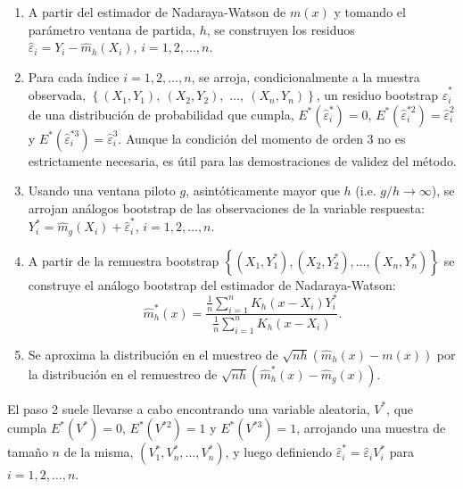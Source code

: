 \documentclass[
]{book}
\theoremstyle{definition}
\theoremstyle{definition}
\theoremstyle{definition}
\theoremstyle{remark}
\begin{document}
\begin{enumerate}
\def\labelenumi{\arabic{enumi}.}
\item
  A partir del estimador de Nadaraya-Watson de \(m\left( x \right)\) y
  tomando el parámetro ventana de partida, \(h\), se construyen los
  residuos
  \(\hat{\varepsilon}_i = Y_i - \hat{m}_{h}\left( X_i \right)\),
  \(i=1, 2, \ldots, n\).
\item
  Para cada índice \(i=1,2,\ldots ,n\), se arroja, condicionalmente a la
  muestra observada, \(\left\{ \left( X_1,Y_1 \right), \ \left( X_2,Y_2 \right),\right.\)
  \(\left.\ldots ,\ \left( X_n,Y_n \right) \right\}\),
  un residuo bootstrap \(\hat{\varepsilon}_i^{\ast}\) de una
  distribución de probabilidad que cumpla,
  \(E^{\ast}\left( \hat{\varepsilon}_i^{\ast} \right) =0\),
  \(E^{\ast}\left( \hat{\varepsilon}_i^{\ast 2} \right) =\hat{ \varepsilon}_i^2\) y \(E^{\ast}\left( \hat{\varepsilon}_i^{\ast 3} \right) =\hat{\varepsilon}_i^{3}\). Aunque la condición del
  momento de orden 3 no es estrictamente necesaria, es útil para las
  demostraciones de validez del método.
\item
  Usando una ventana piloto \(g\), asintóticamente mayor que \(h\) (i.e.
  \(g/h\rightarrow \infty\)), se arrojan análogos bootstrap de las
  observaciones de la variable respuesta:
  \(Y_i^{\ast}=\hat{m}_{g}\left(X_i \right)  +\hat{\varepsilon}_i^{\ast}\), \(i=1,2,\ldots ,n\).
\item
  A partir de la remuestra bootstrap \(\left\{ \left( X_1,Y_1^{\ast } \right),\left( X_2,Y_2^{\ast} \right),\ldots ,\left( X_n,Y_n^{\ast} \right) \right\}\) se construye el análogo
  bootstrap del estimador de Nadaraya-Watson:
  \[\hat{m}_{h}^{\ast}\left( x \right) =\frac{\frac{1}{n}\sum_{i=1}^{n}K_{h}
  \left( x-X_i \right) Y_i^{\ast}}{\frac{1}{n}\sum_{i=1}^{n}K_{h}\left(
  x-X_i \right)}.\]
\item
  Se aproxima la distribución en el muestreo de \(\sqrt{nh}\left( \hat{m}_{h}\left( x \right) -m\left( x \right) \right)\) por la
  distribución en el remuestreo de
  \(\sqrt{nh}\left( \hat{m}_{h}^{\ast}\left( x \right) - \hat{m}_{g}\left( x \right) \right)\).
\end{enumerate}

El paso 2 suele llevarse a cabo encontrando una variable aleatoria,
\(V^{\ast}\), que cumpla \(E^{\ast}\left( V^{\ast} \right) =0\), \(E^{\ast}\left( V^{\ast 2} \right) =1\) y \(E^{\ast}\left( V^{\ast 3} \right) =1\),
arrojando una muestra de tamaño \(n\) de la misma,
\(\left( V_1^{\ast},V_n^{\ast},\ldots ,V_n^{\ast} \right)\), y luego
definiendo \(\hat{\varepsilon}_i^{\ast}=\hat{\varepsilon}_iV_i^{\ast}\)
para \(i=1, 2, \ldots, n\).
\end{document}
